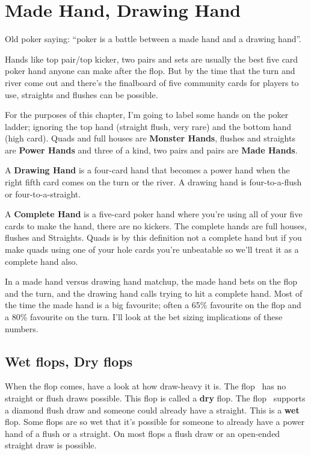 \chapter{Made Hand, Drawing Hand}


Old poker saying: ``poker is a battle between a made hand and a
drawing hand''.

Hands like top pair/top kicker, two pairs and sets
are usually the best five card poker hand anyone can
make after the flop. But by the time that the turn and river come out
and there's the finalboard of five community cards for players to use,
straights and flushes can be possible.

For the purposes of this chapter, I'm going to label some hands on the
poker ladder; ignoring the top hand (straight flush, very rare) and
the bottom hand (high card). Quads and full houses are \textbf{Monster
Hands}, flushes and straights are \textbf{Power Hands} and three of a
kind, two pairs and pairs are \textbf{Made Hands}.

A \textbf{Drawing Hand} is a four-card hand that becomes a power hand
when the right fifth card comes on the turn or the river. A drawing hand
is four-to-a-flush or four-to-a-straight.

A \textbf{Complete Hand} is a five-card poker hand where
you're using all of your five cards to make the hand, there are no
kickers. The complete hands are full houses, flushes and
Straights. Quads is by this definition not a complete hand
but if you make quads using one of your hole cards you're
unbeatable so we'll treat it as a complete hand also.


In a made hand versus drawing hand matchup, the made hand bets on the
flop and the turn, and the drawing hand calls trying to hit a
complete hand. Most of the time the made hand is a big favourite;
often a 65\% favourite on the flop and a 80\% favourite on the
turn. I'll look at the bet sizing implications of these numbers.

\section{Wet flops, Dry flops}

When the flop comes, have a look at how draw-heavy it is. The flop 
\Ks\eigh\trec\ has no straight or flush draws possible. This flop is
called a \textbf{dry} flop. The flop \Jd\tend\eigs\ supports a diamond
flush draw and someone could already have a straight. This is a
\textbf{wet} flop. Some flops are so wet that it's possible for
someone to already have a power hand of a flush or a straight. On most
flops a flush draw or an open-ended straight draw is possible.

